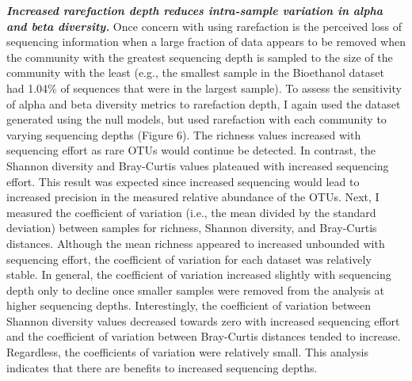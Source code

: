 \documentclass[
]{article}
\begin{document}
\textbf{\emph{Increased rarefaction depth reduces intra-sample variation
in alpha and beta diversity.}} Once concern with using rarefaction is
the perceived loss of sequencing information when a large fraction of
data appears to be removed when the community with the greatest
sequencing depth is sampled to the size of the community with the least
(e.g., the smallest sample in the Bioethanol dataset had 1.04\% of
sequences that were in the largest sample). To assess the sensitivity of
alpha and beta diversity metrics to rarefaction depth, I again used the
dataset generated using the null models, but used rarefaction with each
community to varying sequencing depths (Figure 6). The richness values
increased with sequencing effort as rare OTUs would continue be
detected. In contrast, the Shannon diversity and Bray-Curtis values
plateaued with increased sequencing effort. This result was expected
since increased sequencing would lead to increased precision in the
measured relative abundance of the OTUs. Next, I measured the
coefficient of variation (i.e., the mean divided by the standard
deviation) between samples for richness, Shannon diversity, and
Bray-Curtis distances. Although the mean richness appeared to increased
unbounded with sequencing effort, the coefficient of variation for each
dataset was relatively stable. In general, the coefficient of variation
increased slightly with sequencing depth only to decline once smaller
samples were removed from the analysis at higher sequencing depths.
Interestingly, the coefficient of variation between Shannon diversity
values decreased towards zero with increased sequencing effort and the
coefficient of variation between Bray-Curtis distances tended to
increase. Regardless, the coefficients of variation were relatively
small. This analysis indicates that there are benefits to increased
sequencing depths.
\end{document}
